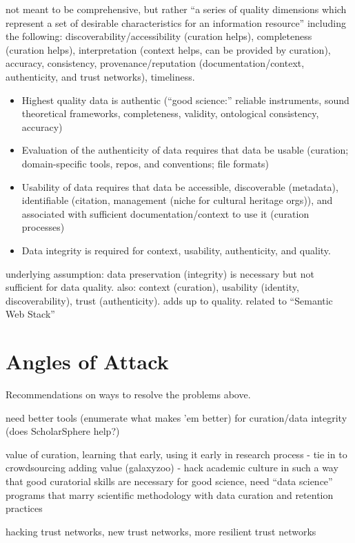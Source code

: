\documentclass{acm_proc_article-sp}
\begin{document}
not meant to be comprehensive, but rather ``a series of quality
dimensions which represent a set of desirable characteristics for an
information resource''\cite{curry:community} including the following:
discoverability/accessibility (curation helps), completeness (curation
helps), interpretation (context helps, can be provided by curation),
accuracy, consistency, provenance/reputation (documentation/context,
authenticity, and trust networks), timeliness.



\begin{itemize}
\item Highest quality data is authentic (``good science:'' reliable
  instruments, sound theoretical frameworks, completeness, validity,
  ontological consistency, accuracy)
\item Evaluation of the authenticity of data requires that data be usable
  (curation; domain-specific tools, repos, and conventions; file formats)
\item Usability of data requires that data be accessible, discoverable
  (metadata), identifiable (citation, management (niche for cultural
  heritage orgs)), and associated with sufficient
  documentation/context to use it (curation processes)
\item Data integrity is required for context, usability, authenticity, and
  quality.
\end{itemize}

underlying assumption: data preservation (integrity) is necessary but not
sufficient for data quality. also: context (curation), usability (identity,
discoverability), trust (authenticity). adds up to quality. related to
``Semantic Web Stack''

\section{Angles of Attack}
Recommendations on ways to resolve the problems above.

need better tools (enumerate what makes 'em better) for curation/data
integrity (does ScholarSphere help?)

value of curation, learning that early, using it early in research process -
tie in to crowdsourcing adding value (galaxyzoo) - hack academic culture in
such a way that good curatorial skills are necessary for good science, need
``data science'' programs that marry scientific methodology with data curation
and retention practices

hacking trust networks, new trust networks, more resilient trust networks

{}



\end{document}
